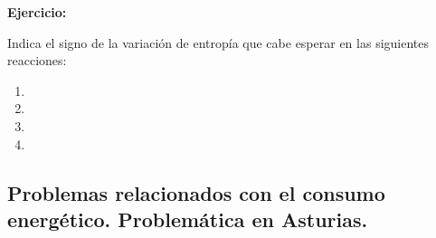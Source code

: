 \documentclass[
  spanish,
]{article}
\begin{document}
\textbf{Ejercicio:}

\begin{exercise}Indica el signo de la variación de entropía que cabe
esperar en las siguientes reacciones:

\begin{enumerate}
\def\labelenumi{\alph{enumi})}
\item
\item
\item
\item
\end{enumerate}

\end{exercise}

\hypertarget{problemas-relacionados-con-el-consumo-energuxe9tico.-problemuxe1tica-en-asturias.}{%
\subsection{Problemas relacionados con el consumo energético.
Problemática en
Asturias.}\label{problemas-relacionados-con-el-consumo-energuxe9tico.-problemuxe1tica-en-asturias.}}

\newpage
{}
{\small \printsolutions}
\end{document}
